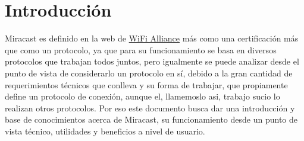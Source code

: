 \section{Introducción}

Miracast es definido en la web de \href{http://www.wi-fi.org/discover-wi-fi/wi-fi-certified-miracast}{WiFi Alliance} más como una certificación más que como un protocolo, ya que para su funcionamiento se basa en diversos protocolos que trabajan todos juntos, pero igualmente se puede analizar desde el punto de vista de considerarlo un protocolo en sí, debido a la gran cantidad de requerimientos técnicos que conlleva y su forma de trabajar, que propiamente define un protocolo de conexión, aunque el, llamemoslo asi, trabajo sucio lo realizan otros protocolos. Por eso este documento busca dar una introducción y base de conocimientos acerca de Miracast, su funcionamiento desde un punto de vista técnico, utilidades y beneficios a nivel de usuario.
